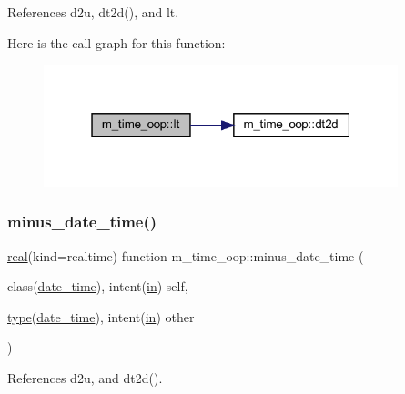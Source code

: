 References d2u, dt2d(), and lt.

Here is the call graph for this function\+:
\nopagebreak
\begin{figure}[H]
\begin{center}
\leavevmode
\includegraphics[width=292pt]{namespacem__time__oop_ab0c5ce86d25993804501d59a8106818f_cgraph}
\end{center}
\end{figure}
\mbox{\label{namespacem__time__oop_a3da83a42a8f957db9bd2f6f0b942ab99}} 
\subsubsection{\texorpdfstring{minus\+\_\+date\+\_\+time()}{minus\_date\_time()}}
{\footnotesize\ttfamily \hyperlink{read__watch_83_8txt_abdb62bde002f38ef75f810d3a905a823}{real}(kind=realtime) function m\+\_\+time\+\_\+oop\+::minus\+\_\+date\+\_\+time (\begin{DoxyParamCaption}\item[{class(\hyperlink{structm__time__oop_1_1date__time}{date\+\_\+time}), intent(\hyperlink{M__journal_83_8txt_afce72651d1eed785a2132bee863b2f38}{in})}]{self,  }\item[{\hyperlink{stop__watch_83_8txt_a70f0ead91c32e25323c03265aa302c1c}{type}(\hyperlink{structm__time__oop_1_1date__time}{date\+\_\+time}), intent(\hyperlink{M__journal_83_8txt_afce72651d1eed785a2132bee863b2f38}{in})}]{other }\end{DoxyParamCaption})\hspace{0.3cm}{\ttfamily [private]}}



References d2u, and dt2d().

